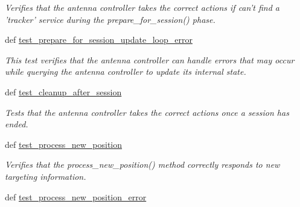 \begin{DoxyCompactItemize}
\begin{DoxyCompactList}\small\item\em Verifies that the antenna controller takes the correct actions if can't find a 'tracker' service during the prepare\-\_\-for\-\_\-session() phase. \end{DoxyCompactList}\item 
def \hyperlink{classhwm_1_1hardware_1_1devices_1_1drivers_1_1mxl__antenna__controller_1_1tests_1_1test__mxl__an2edaee9f18a9d6c35832076cf9ff4beb_a32fbd9891677f82a0885d0128871c15e}{test\-\_\-prepare\-\_\-for\-\_\-session\-\_\-update\-\_\-loop\-\_\-error}
\begin{DoxyCompactList}\small\item\em This test verifies that the antenna controller can handle errors that may occur while querying the antenna controller to update its internal state. \end{DoxyCompactList}\item 
def \hyperlink{classhwm_1_1hardware_1_1devices_1_1drivers_1_1mxl__antenna__controller_1_1tests_1_1test__mxl__an2edaee9f18a9d6c35832076cf9ff4beb_a6d70ef6fbadde6760163db4e2ccebc8b}{test\-\_\-cleanup\-\_\-after\-\_\-session}
\begin{DoxyCompactList}\small\item\em Tests that the antenna controller takes the correct actions once a session has ended. \end{DoxyCompactList}\item 
def \hyperlink{classhwm_1_1hardware_1_1devices_1_1drivers_1_1mxl__antenna__controller_1_1tests_1_1test__mxl__an2edaee9f18a9d6c35832076cf9ff4beb_afe39db5ca8c5b7d23c05394abc7584b4}{test\-\_\-process\-\_\-new\-\_\-position}
\begin{DoxyCompactList}\small\item\em Verifies that the process\-\_\-new\-\_\-position() method correctly responds to new targeting information. \end{DoxyCompactList}\item 
\hypertarget{classhwm_1_1hardware_1_1devices_1_1drivers_1_1mxl__antenna__controller_1_1tests_1_1test__mxl__an2edaee9f18a9d6c35832076cf9ff4beb_a4170db8310c7d93767221365c6304afb}{def \hyperlink{classhwm_1_1hardware_1_1devices_1_1drivers_1_1mxl__antenna__controller_1_1tests_1_1test__mxl__an2edaee9f18a9d6c35832076cf9ff4beb_a4170db8310c7d93767221365c6304afb}{test\-\_\-process\-\_\-new\-\_\-position\-\_\-error}}\label{classhwm_1_1hardware_1_1devices_1_1drivers_1_1mxl__antenna__controller_1_1tests_1_1test__mxl__an2edaee9f18a9d6c35832076cf9ff4beb_a4170db8310c7d93767221365c6304afb}


\end{DoxyCompactItemize}
